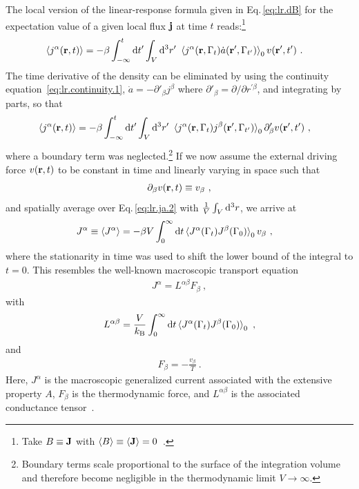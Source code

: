 The local version of the linear-response formula given in Eq.\,\eqref{eq:lr.dB} for the expectation value of a given local flux $\bf j$ at time $t$ reads:\footnote{Take \mbox{$B \equiv {\bf J}$} with $\braket{B} \equiv \braket{{\bf J}} = 0$~.}
\begin{align}
\braket{j^\alpha (\b r, t)}
	&= - \beta \int_{-\infty}^{t} \d t' \int_V \d^3 r' ~ \braket{
			j^\alpha (\b r, \Gamma_t) \dot{a} (\b r', \Gamma_{t'})
		}_0 v (\b r', t')~.
	\label{eq:lr.ja.1}
\end{align}
The time derivative of the density can be eliminated by using the continuity equation~\eqref{eq:lr.continuity.1}, $\dot a = - \partial'_\beta j^\beta$ where $\partial'_\beta = \partial/\partial r^{\prime \beta}$, and integrating by parts, so that
\begin{align}
\braket{j^\alpha (\b r , t) }
&= - \beta \int_{-\infty}^{t} \d t' \int_V \d^3 r' ~ \braket{
	j^\alpha (\b r, \Gamma_t) j^\beta (\b r', \Gamma_{t'})
}_0 \partial'_\beta v (\b r', t')~,
\label{eq:lr.ja.2}
\end{align}
where a boundary term was neglected.\footnote{Boundary terms scale proportional to the surface of the integration volume and therefore become negligible in the thermodynamic limit $V \to \infty$.}
If we now assume the external driving force $v ({\bf r}, t)$ to be constant in time and linearly varying in space such that
\begin{align}
	\partial_\beta v (\b r, t) \equiv v_\beta~,
	\label{eq:lr.force}
\end{align}
and spatially average over Eq.\,\eqref{eq:lr.ja.2} with $\frac{1}{V} \int_V {\rm d}^3 r$, we arrive at
\begin{align}
	J^\alpha 
	\equiv \braket{J^\alpha}
		&= -\beta V \int_{0}^{\infty} 
		\d t
		\braket{
		J^\alpha (\Gamma_t) J^\beta (\Gamma_{0})
	}_0 
	v_\beta~,
	\label{eq:lr.J}
\end{align}
where the stationarity in time was used to shift the lower bound of the integral to $t=0$.
This resembles the well-known macroscopic transport equation
\begin{align}
	J^\alpha =  L^{\alpha \beta} F_\beta~,
		\label{eq:lr.LF}
\end{align}
with
\begin{align}
	L^{\alpha \beta}
		= \frac{V}{k_{\rm B}} \int_{0}^{\infty} 
		\d t \braket{J^\alpha (\Gamma_t) J^\beta (\Gamma_{0})}_0 ~,
	\label{eq:lr.L}
\end{align}
and
\begin{align}
	F_\beta
		= - \frac{v_\beta}{T}~.
	\label{eq:lr.F}
\end{align}
Here, $J^\alpha$ is the macroscopic generalized current associated with the extensive property $A$, $F_\beta$ is the thermodynamic force, and $L^{\alpha \beta}$ is the associated conductance tensor~\cite{Onsager1931a,Baroni2020a}.

